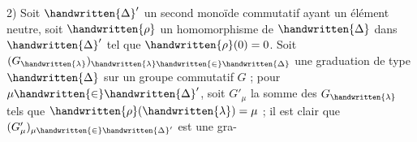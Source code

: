 2) Soit $\handwritten{\Delta}'$ un second monoïde commutatif ayant un élément neutre,  soit $\handwritten{\rho}$ un
homomorphisme de $\handwritten{\Delta}$ dans $\handwritten{\Delta}'$ tel que $\handwritten{\rho}(0)=0$. Soit $(G_{\handwritten{\lambda}})_{\handwritten{\lambda}\handwritten{\in}\handwritten{\Delta}}$ une graduation de type $\handwritten{\Delta}$ sur un groupe commutatif $G$ ; pour $\mu\handwritten{\in}\handwritten{\Delta}'$, soit $G'_\mu$ la
somme des $G_{\handwritten{\lambda}}$ tels que $\handwritten{\rho}(\handwritten{\lambda})=\mu$ ; il est clair que $(G'_\mu)_{\mu\handwritten{\in}\handwritten{\Delta}'}$ est une gra-

